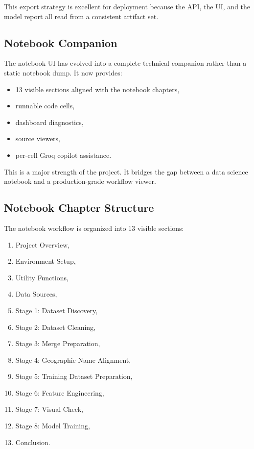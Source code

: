 \documentclass[11pt,a4paper]{article}
\begin{document}
This export strategy is excellent for deployment because the API, the UI, and the model report all read from a consistent artifact set.

\subsection{Notebook Companion}

The notebook UI has evolved into a complete technical companion rather than a static notebook dump. It now provides:

\begin{itemize}
\item 13 visible sections aligned with the notebook chapters,
\item runnable code cells,
\item dashboard diagnostics,
\item source viewers,
\item per-cell Groq copilot assistance.
\end{itemize}

This is a major strength of the project. It bridges the gap between a data science notebook and a production-grade workflow viewer.

\subsection{Notebook Chapter Structure}

The notebook workflow is organized into 13 visible sections:

\begin{enumerate}
\item Project Overview,
\item Environment Setup,
\item Utility Functions,
\item Data Sources,
\item Stage 1: Dataset Discovery,
\item Stage 2: Dataset Cleaning,
\item Stage 3: Merge Preparation,
\item Stage 4: Geographic Name Alignment,
\item Stage 5: Training Dataset Preparation,
\item Stage 6: Feature Engineering,
\item Stage 7: Visual Check,
\item Stage 8: Model Training,
\item Conclusion.
\end{enumerate}
\end{document}

